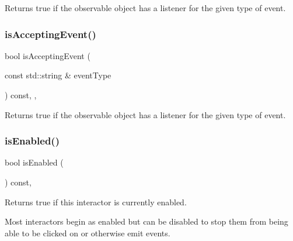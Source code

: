 Returns true if the observable object has a listener for the given type of event. 

\mbox{\label{classGObservable_a3b1c689267eda44e65a2213e7de38b23}} 
\subsubsection{\texorpdfstring{is\+Accepting\+Event()}{isAcceptingEvent()}\hspace{0.1cm}{\footnotesize\ttfamily [3/3]}}
{\footnotesize\ttfamily bool is\+Accepting\+Event (\begin{DoxyParamCaption}\item[{const std\+::string \&}]{event\+Type }\end{DoxyParamCaption}) const\hspace{0.3cm}{\ttfamily [protected]}, {\ttfamily [virtual]}, {\ttfamily [inherited]}}



Returns true if the observable object has a listener for the given type of event. 

\mbox{\label{classGInteractor_aacb819fb241851fd9fc045271baa4034}} 
\subsubsection{\texorpdfstring{is\+Enabled()}{isEnabled()}}
{\footnotesize\ttfamily bool is\+Enabled (\begin{DoxyParamCaption}{ }\end{DoxyParamCaption}) const\hspace{0.3cm}{\ttfamily [virtual]}, {\ttfamily [inherited]}}



Returns true if this interactor is currently enabled. 

Most interactors begin as enabled but can be disabled to stop them from being able to be clicked on or otherwise emit events. \mbox{\label{classGInteractor_a9d8a6cfb13917785c143e74d40e4e2be}} 
